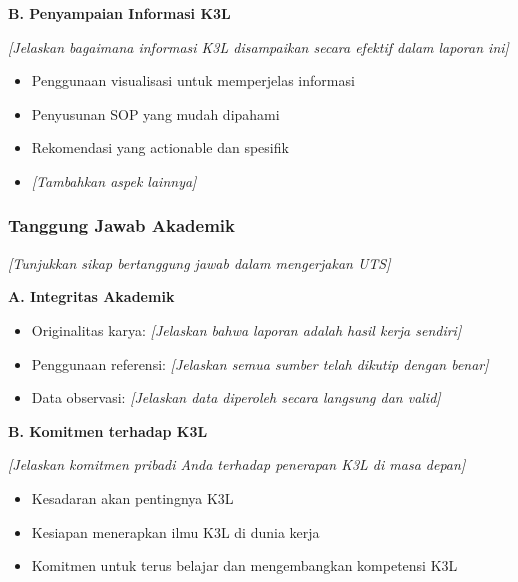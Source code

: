 \vspace{0.5cm}

\textbf{B. Penyampaian Informasi K3L}

\textit{[Jelaskan bagaimana informasi K3L disampaikan secara efektif dalam laporan ini]}

\begin{itemize}
    \item Penggunaan visualisasi untuk memperjelas informasi
    \item Penyusunan SOP yang mudah dipahami
    \item Rekomendasi yang actionable dan spesifik
    \item \textit{[Tambahkan aspek lainnya]}
\end{itemize}

\vspace{0.5cm}

\subsubsection{Tanggung Jawab Akademik}

\textit{[Tunjukkan sikap bertanggung jawab dalam mengerjakan UTS]}

\textbf{A. Integritas Akademik}

\begin{itemize}
    \item Originalitas karya: \textit{[Jelaskan bahwa laporan adalah hasil kerja sendiri]}
    \item Penggunaan referensi: \textit{[Jelaskan semua sumber telah dikutip dengan benar]}
    \item Data observasi: \textit{[Jelaskan data diperoleh secara langsung dan valid]}
\end{itemize}

\vspace{0.5cm}

\textbf{B. Komitmen terhadap K3L}

\textit{[Jelaskan komitmen pribadi Anda terhadap penerapan K3L di masa depan]}

\begin{itemize}
    \item Kesadaran akan pentingnya K3L
    \item Kesiapan menerapkan ilmu K3L di dunia kerja
    \item Komitmen untuk terus belajar dan mengembangkan kompetensi K3L
\end{itemize}

